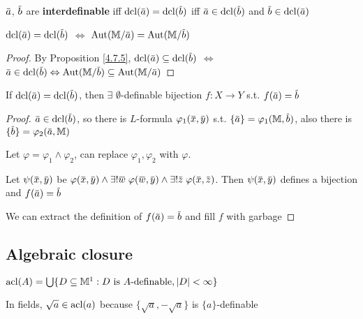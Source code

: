 \documentclass[11pt]{article}
\begin{document}
\begin{definition}[]
\(\bara\), \(\barb\) are \textbf{interdefinable} iff \(\dcl(\bara)=\dcl(\barb)\) iff \(\bara\in\dcl(\barb)\)
and \(\barb\in\dcl(\bara)\)
\end{definition}

\begin{lemma}[]
\label{4.7.11}
\(\dcl(\bara)=\dcl(\barb)\) \(\Leftrightarrow\)  \(\Aut(\M/\bara)=\Aut(\M/\barb)\)
\end{lemma}

\begin{proof}
By Proposition \ref{4.7.5}, \(\dcl(\bara)\subseteq\dcl(\barb)\) \(\Leftrightarrow\) \(\bara\in\dcl(\barb)\Leftrightarrow\Aut(\M/\barb)\subseteq\Aut(\M/\bara)\)
\end{proof}

\begin{lemma}[]
\label{4.7.12}
If \(\dcl(\bara)=\dcl(\barb)\), then \(\exists\) \(\emptyset\)-definable bijection \(f:X\to Y\) s.t. \(f(\bara)=\barb\)
\end{lemma}

\begin{proof}
\(\bara\in\dcl(\barb)\), so there is \(L\)-formula \(\varphi_1(\barx,\bary)\)
s.t. \(\{\bara\}=\varphi_1(\M,\barb)\), also there is \(\{\barb\}=\varphi_2(\bara,\M)\)

Let \(\varphi=\varphi_1\wedge\varphi_2\), can replace \(\varphi_1,\varphi_2\) with \(\varphi\).

Let \(\psi(\barx,\bary)\) be \(\varphi(\barx,\bary)\wedge\exists!\barw\;\varphi(\barw,\bary)\wedge\exists!\barz\;\varphi(\barx,\barz)\).
Then \(\psi(\barx,\bary)\) defines a bijection and \(f(\bara)=\barb\)

We can extract the definition of \(f(\bara)=\barb\) and fill \(f\) with garbage
\end{proof}

\subsection{Algebraic closure}
\label{sec:org483db57}
\begin{definition}[]
\(\acl(A)=\bigcup\{D\subseteq\M^1:D\text{ is }A\text{-definable},\abs{D}<\infty\}\)
\end{definition}

\begin{examplle}[]
In fields, \(\sqrt{a}\in\operatorname{acl}(a)\) because \(\{\sqrt{a},-\sqrt{a}\}\) is \(\{a\}\)-definable
\end{examplle}
\end{document}
